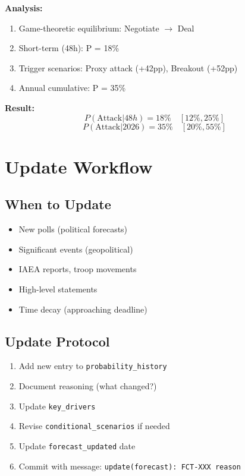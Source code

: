 \textbf{Analysis:}
\begin{enumerate}
    \item Game-theoretic equilibrium: Negotiate $\rightarrow$ Deal
    \item Short-term (48h): P = 18\%
    \item Trigger scenarios: Proxy attack (+42pp), Breakout (+52pp)
    \item Annual cumulative: P = 35\%
\end{enumerate}

\textbf{Result:}
\[
P(\text{Attack}|48h) = 18\% \quad [12\%, 25\%]
\]
\[
P(\text{Attack}|2026) = 35\% \quad [20\%, 55\%]
\]

\section{Update Workflow}
\label{sec:fct-update}

\subsection{When to Update}

\begin{itemize}
    \item New polls (political forecasts)
    \item Significant events (geopolitical)
    \item IAEA reports, troop movements
    \item High-level statements
    \item Time decay (approaching deadline)
\end{itemize}

\subsection{Update Protocol}

\begin{enumerate}
    \item Add new entry to \texttt{probability\_history}
    \item Document reasoning (what changed?)
    \item Update \texttt{key\_drivers}
    \item Revise \texttt{conditional\_scenarios} if needed
    \item Update \texttt{forecast\_updated} date
    \item Commit with message: \texttt{update(forecast): FCT-XXX reason}
\end{enumerate}

